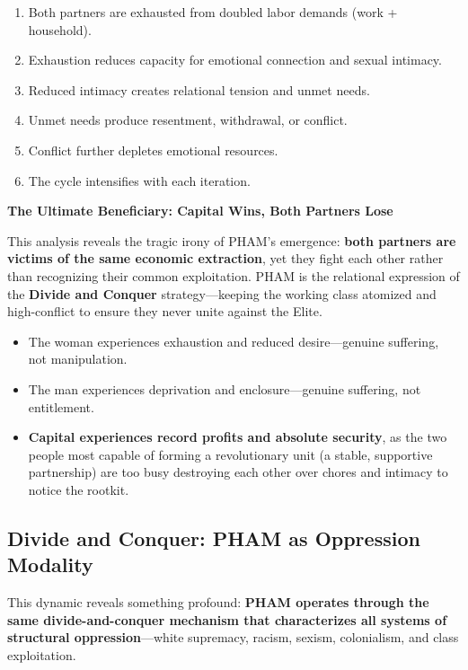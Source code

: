 \documentclass[12pt,openany]{book}
\numberwithin{equation}{chapter}
\begin{document}
\begin{enumerate}
    \item Both partners are exhausted from doubled labor demands (work + household).
    \item Exhaustion reduces capacity for emotional connection and sexual intimacy.
    \item Reduced intimacy creates relational tension and unmet needs.
    \item Unmet needs produce resentment, withdrawal, or conflict.
    \item Conflict further depletes emotional resources.
    \item The cycle intensifies with each iteration.
\end{enumerate}

\textbf{The Ultimate Beneficiary: Capital Wins, Both Partners Lose}

This analysis reveals the tragic irony of PHAM's emergence: \textbf{both partners are victims of the same economic extraction}, yet they fight each other rather than recognizing their common exploitation. PHAM is the relational expression of the \textbf{Divide and Conquer} strategy---keeping the working class atomized and high-conflict to ensure they never unite against the Elite.

\begin{itemize}
    \item The woman experiences exhaustion and reduced desire---genuine suffering, not manipulation.
    \item The man experiences deprivation and enclosure---genuine suffering, not entitlement.
    \item \textbf{Capital experiences record profits and absolute security}, as the two people most capable of forming a revolutionary unit (a stable, supportive partnership) are too busy destroying each other over chores and intimacy to notice the rootkit.
\end{itemize}

\subsection{Divide and Conquer: PHAM as Oppression Modality}

This dynamic reveals something profound: \textbf{PHAM operates through the same divide-and-conquer mechanism that characterizes all systems of structural oppression}---white supremacy, racism, sexism, colonialism, and class exploitation.
\end{document}
